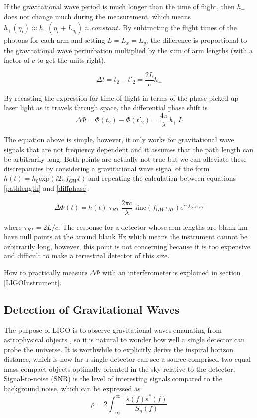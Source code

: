 	If the gravitational wave period is much longer than the time of flight, then $h_{+}$ does not change much during the measurement, which means $h_{+}(\eta_i) \approx h_{+}(\eta_i + L_{\eta_i}) \approx constant$.  By subtracting the flight times of the photons for each arm and setting $L = L_x = L_y$, the difference is proportional to the gravitational wave perturbation multiplied by the sum of arm lengths (with a factor of $c$ to get the units right),
	
	\begin{equation}
	\Delta t = t_2 - t'_{2} = \frac{2L}{c} h_{+}
	\end{equation}
	
	By recasting the expression for time of flight in terms of the phase picked up laser light as it travels through space, the differential phase shift is
	\begin{equation}\label{diffphase}
	\Delta \Phi = \Phi(t_{2}) - \Phi(t'_{2}) = \frac{4 \pi}{\lambda} \, h_{+} \, L
	\end{equation}
	
	The equation above is simple, however, it only works for gravitational wave signals that are not frequency dependent and it assumes that the path length can be arbitrarily long. Both points are actually not true \cite{Saulson} but we can alleviate these discrepancies by considering a gravitational wave signal of the form $h(t) = h_0 \text{exp} (i 2 \pi f_{GW} t)$  and repeating the calculation between equations \ref{pathlength} and \ref{diffphase}:
	
	\begin{equation}\label{gwsinc}
	\Delta \Phi (t) = h(t) \; \tau_{RT} \; \frac{2 \pi c}{\lambda} \; \text{sinc}(f_{GW} \tau_{RT}) e^{i \pi f_{GW} \tau_{RT}}
	\end{equation}
	
	where $\tau_{RT} = 2L/c$.  The response for a detector whose arm lengths are blank km have null points at the around blank Hz which means the instrument cannot be arbitrarily long, however, this point is not concerning because it is too expensive and difficult to make a terrestrial detector of this size.
	
	How to practically measure $\Delta \Phi$ with an interferometer is explained in section \ref{LIGOInstrument}.

	\subsection{Detection of Gravitational Waves}\label{detectgw}
	The purpose of LIGO is to observe gravitational waves emanating from astrophysical objects \cite{NSFproposal}, so it is natural to wonder how well a single detector can probe the universe.  It is worthwhile to explicitly derive the inspiral horizon distance, which is how far a single detector can see a source comprised two equal mass compact objects optimally oriented in the sky relative to the detector.  Signal-to-noise (SNR) is the level of interesting signals compared to the background noise, which can be expressed as
	\begin{equation}\label{SNR}
	\rho = 2 \int_{-\infty}^{\infty} \frac{ \tilde{s}(f) \tilde{s}^*(f) }{S_n(f)}
	\end{equation}
	
